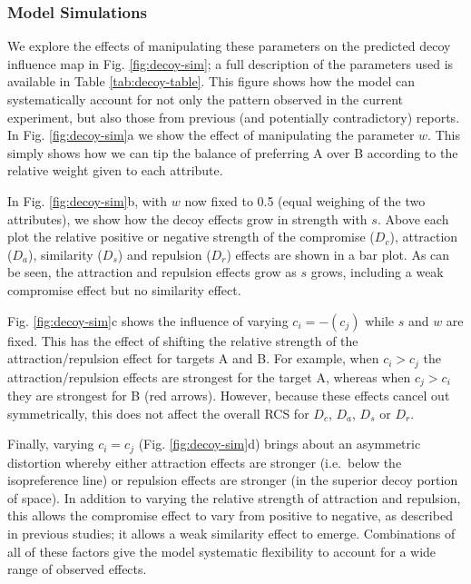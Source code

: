 \documentclass[a4paper, nobind]{templates/ociamthesis}
\begin{document}
\hypertarget{model-simulations}{%
\subsubsection{Model Simulations}\label{model-simulations}}

We explore the effects of manipulating these parameters on the predicted decoy influence map in Fig. \ref{fig:decoy-sim}; a full description of the parameters used is available in Table \ref{tab:decoy-table}. This figure shows how the model can systematically account for not only the pattern observed in the current experiment, but also those from previous (and potentially contradictory) reports. In Fig. \ref{fig:decoy-sim}a we show the effect of manipulating the parameter \(w\). This simply shows how we can tip the balance of preferring A over B according to the relative weight given to each attribute.

In Fig. \ref{fig:decoy-sim}b, with \(w\) now fixed to 0.5 (equal weighing of the two attributes), we show how the decoy effects grow in strength with \(s\). Above each plot the relative positive or negative strength of the compromise (\(D_c\)), attraction (\(D_a\)), similarity (\(D_s\)) and repulsion (\(D_r\)) effects are shown in a bar plot. As can be seen, the attraction and repulsion effects grow as \(s\) grows, including a weak compromise effect but no similarity effect.

Fig. \ref{fig:decoy-sim}c shows the influence of varying \(c_i=-(c_j)\) while \(s\) and \(w\) are fixed. This has the effect of shifting the relative strength of the attraction/repulsion effect for targets A and B. For example, when \(c_i>c_j\) the attraction/repulsion effects are strongest for the target A, whereas when \(c_j>c_i\) they are strongest for B (red arrows). However, because these effects cancel out symmetrically, this does not affect the overall RCS for \(D_c\), \(D_a\), \(D_s\) or \(D_r\).

Finally, varying \(c_i=c_j\) (Fig. \ref{fig:decoy-sim}d) brings about an asymmetric distortion whereby either attraction effects are stronger (i.e.~below the isopreference line) or repulsion effects are stronger (in the superior decoy portion of space). In addition to varying the relative strength of attraction and repulsion, this allows the compromise effect to vary from positive to negative, as described in previous studies; it allows a weak similarity effect to emerge. Combinations of all of these factors give the model systematic flexibility to account for a wide range of observed effects.
\end{document}
